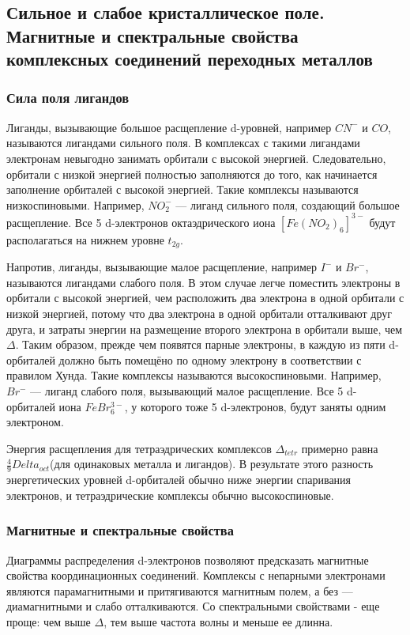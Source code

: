 
\subsection{Сильное и слабое кристаллическое поле. Магнитные и спектральные свойства комплексных соединений переходных металлов}

\subsubsection*{Сила поля лигандов}


Лиганды, вызывающие большое расщепление d-уровней, например $CN^-$ и $CO$, называются лигандами сильного поля. В комплексах с такими лигандами электронам невыгодно занимать орбитали с высокой энергией. Следовательно, орбитали с низкой энергией полностью заполняются до того, как начинается заполнение орбиталей с высокой энергией. Такие комплексы называются низкоспиновыми. Например, $NO_2^-$ — лиганд сильного поля, создающий большое расщепление. Все 5 d-электронов октаэдрического иона $[Fe(NO_2)_6]^{3-}$ будут располагаться на нижнем уровне $t_{2g}$.

Напротив, лиганды, вызывающие малое расщепление, например $I^-$ и $Br^-$, называются лигандами слабого поля. В этом случае легче поместить электроны в орбитали с высокой энергией, чем расположить два электрона в одной орбитали с низкой энергией, потому что два электрона в одной орбитали отталкивают друг друга, и затраты энергии на размещение второго электрона в орбитали выше, чем $\Delta$. Таким образом, прежде чем появятся парные электроны, в каждую из пяти d-орбиталей должно быть помещёно по одному электрону в соответствии с правилом Хунда. Такие комплексы называются высокоспиновыми. Например, $Br^-$ — лиганд слабого поля, вызывающий малое расщепление. Все 5 d-орбиталей иона $FeBr_6^{3-}$, у которого тоже 5 d-электронов, будут заняты одним электроном.

Энергия расщепления для тетраэдрических комплексов $\Delta_{tetr}$ примерно равна $\frac 49 Delta_{oct}$(для одинаковых металла и лигандов). В результате этого разность энергетических уровней d-орбиталей обычно ниже энергии спаривания электронов, и тетраэдрические комплексы обычно высокоспиновые.

\subsubsection*{Магнитные и спектральные свойства}
Диаграммы распределения d-электронов позволяют предсказать магнитные свойства координационных соединений. Комплексы с непарными электронами являются парамагнитными и притягиваются магнитным полем, а без — диамагнитными и слабо отталкиваются. Со спектральными свойствами - еще проще: чем выше $\Delta$, тем выше частота волны и меньше ее длинна.